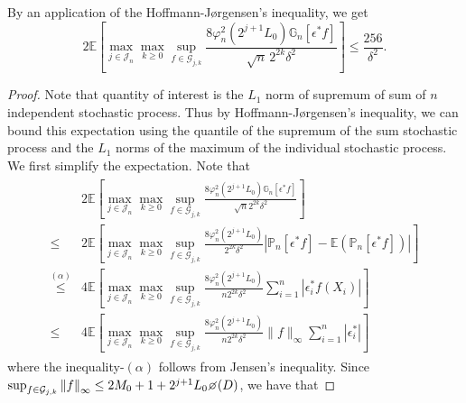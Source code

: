 \begin{lemma}\label{lem:Hoff_Jorg}
By an application of the Hoffmann-J{\o}rgensen's inequality, we get 
\begin{equation}
2\mathbb{E}\left[\max_{j\in \mathcal{J}_n}\max_{k \ge 0}\sup_{f\in\mathcal{G}_{j,k}} \frac{8\varphi_n^2(2^{j+1}L_0)\mathbb{G}_n[\epsilon^* f]}{\sqrt{n}\,2^{2k}\delta^2}\right] \le \frac{256}{\delta^2}.
\end{equation}


\end{lemma}
\begin{proof}
Note that quantity of interest is the $L_1$ norm of supremum of sum of $n$ independent stochastic process. Thus by Hoffmann-J{\o}rgensen's inequality, we can bound this expectation using the quantile of the supremum of the sum stochastic process and  the  $L_1$ norms of the maximum of the individual stochastic process. We first simplify the expectation. Note that 
\begin{align}\label{eq:hof_1}
\begin{split}
& 2\mathbb{E}\left[\max_{j\in \mathcal{J}_n}\max_{k \ge 0}\sup_{f\in\mathcal{G}_{j,k}} \frac{8\varphi_n^2(2^{j+1}L_0)\mathbb{G}_n[\epsilon^* f]}{\sqrt{n}2^{2k}\delta^2}\right]\\
\le{}& 2\mathbb{E}\left[\max_{j\in \mathcal{J}_n}\max_{k \ge 0}\sup_{f\in\mathcal{G}_{j,k}} \frac{8\varphi_n^2(2^{j+1}L_0)}{2^{2k}\delta^2}\left\vert\mathbb{P}_n[\epsilon^* f]- \mathbb{E}(\mathbb{P}_n[\epsilon^* f])\right\vert\right]\\
\stackrel{(\alpha)}{\le}{}& 4\mathbb{E}\left[\max_{j\in \mathcal{J}_n}\max_{k \ge 0}\sup_{f\in\mathcal{G}_{j,k}} \frac{8\varphi_n^2(2^{j+1}L_0)}{n2^{2k}\delta^2}\sum_{i=1}^n |\epsilon^*_{i}f(X_i)|\right]\\
{\le}{}& 4\mathbb{E}\left[\max_{j\in \mathcal{J}_n}\max_{k \ge 0}\sup_{f\in\mathcal{G}_{j,k}} \frac{8\varphi_n^2(2^{j+1}L_0)}{n2^{2k}\delta^2} \|f\|_{\infty}\sum_{i=1}^n  |\epsilon^*_{i}|\right]
\end{split}
\end{align}
where the inequality-$(\alpha)$ follows from Jensen's inequality.  Since  $\sup_{f\in\mathcal{G}_{j,k}} \norm{f}_{\infty} \le 2M_0 + 1 + 2^{j+1}L_0\diameter(D)$, we have that


\end{proof}
